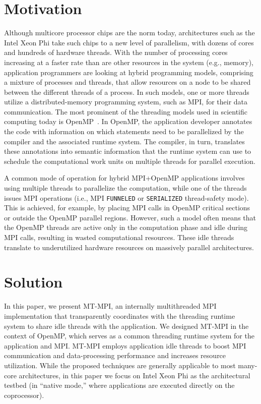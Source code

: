 \section{Motivation}

Although multicore processor chips are the norm today, architectures
such as the Intel Xeon Phi take such chips to a new level of
parallelism, with dozens of cores and hundreds of hardware threads.
With the number of processing cores increasing at a faster rate than
are other resources in the system (e.g., memory), application
programmers are looking at hybrid programming models, comprising a
mixture of processes and threads, that allow resources on a node to be
shared between the different threads of a process.  In such models,
one or more threads utilize a distributed-memory programming system,
such as MPI, for their data communication.  The most prominent of the
threading models used in scientific computing today is
OpenMP~\cite{openmp}.  In OpenMP, the application developer annotates
the code with information on which statements need to be parallelized
by the compiler and the associated runtime system.  The compiler, in
turn, translates these annotations into semantic information that the
runtime system can use to schedule the computational work units on
multiple threads for parallel execution.

A common mode of operation for hybrid MPI+OpenMP applications involves
using multiple threads to parallelize the computation, while one of
the threads issues MPI operations (i.e., MPI \texttt{FUNNELED} or
\texttt{SERIALIZED} thread-safety mode).  This is achieved, for
example, by placing MPI calls in OpenMP critical sections or outside
the OpenMP parallel regions.  However, such a model often means that
the OpenMP threads are active only in the computation phase and idle
during MPI calls, resulting in wasted computational resources.  These
idle threads translate to underutilized hardware resources on
massively parallel architectures.

\section{Solution}

In this paper, we present MT-MPI, an internally multithreaded MPI
implementation that transparently coordinates with the threading
runtime system to share idle threads with the application.  We
designed MT-MPI in the context of OpenMP, which serves as a common
threading runtime system for the application and MPI.  MT-MPI employs
application idle threads to boost MPI communication and
data-processing performance and increases resource utilization.  While
the proposed techniques are generally applicable to most many-core
architectures, in this paper we focus on Intel Xeon Phi as the
architectural testbed (in ``native mode,'' where applications are
executed directly on the coprocessor).

